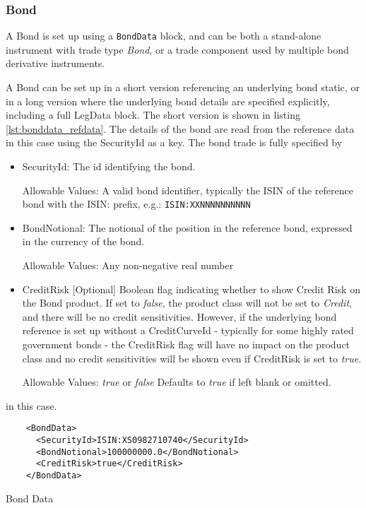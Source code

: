 \subsubsection{Bond}
\label{ss:bond}

A Bond is set up using a {\tt BondData} block, and can be both a stand-alone instrument with trade type \emph{Bond}, or a trade component used by multiple bond derivative instruments.

A Bond can be set up in a short version referencing an underlying bond static, or in a long version where the underlying bond details are specified explicitly, including a full LegData block.
The short version is shown in listing \ref{lst:bonddata_refdata}. The details of the
bond are read from the reference data in this case using the SecurityId as a key. The bond trade is fully specified by

\begin{itemize}
\item SecurityId: The id identifying the bond.

  Allowable Values: A valid bond identifier, typically the ISIN of the reference bond with the ISIN: prefix, e.g.: \verb+ISIN:XXNNNNNNNNNN+
\item BondNotional: The notional of the position in the reference bond, expressed in the currency of the bond.

  Allowable Values: Any non-negative real number
\item CreditRisk [Optional] Boolean flag indicating whether to show Credit Risk on the Bond product. If set to \emph{false}, the product class will  not be set to \emph{Credit}, and there will be no credit sensitivities. However, if the underlying bond reference is set up without a CreditCurveId - typically for some highly rated government bonds -  the CreditRisk flag will have no impact on the product class and no credit sensitivities will be shown even if CreditRisk is set to \emph{true}. 

  Allowable Values: \emph{true} or \emph{false} Defaults to \emph{true} if left blank or omitted.
\end{itemize}

in this case.

\begin{listing}[H]
\begin{verbatim}
    <BondData>
      <SecurityId>ISIN:XS0982710740</SecurityId>
      <BondNotional>100000000.0</BondNotional>
      <CreditRisk>true</CreditRisk>
    </BondData>
\end{verbatim}
\caption{Bond Data}
\label{lst:bonddata_refdata}
\end{listing}

